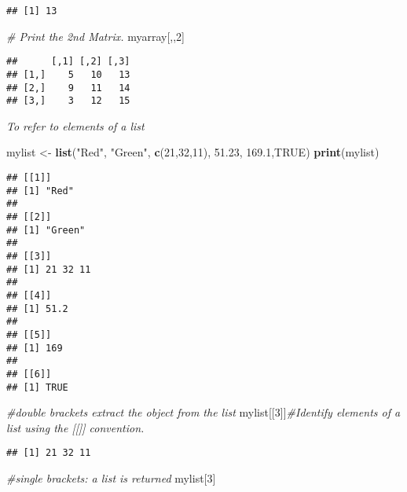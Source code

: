 \documentclass[]{book}
\newenvironment{Shaded}{\begin{snugshade}}{\end{snugshade}}
\newcommand{\KeywordTok}[1]{\textcolor[rgb]{0.13,0.29,0.53}{\textbf{#1}}}
\newcommand{\DecValTok}[1]{\textcolor[rgb]{0.00,0.00,0.81}{#1}}
\newcommand{\FloatTok}[1]{\textcolor[rgb]{0.00,0.00,0.81}{#1}}
\newcommand{\StringTok}[1]{\textcolor[rgb]{0.31,0.60,0.02}{#1}}
\newcommand{\CommentTok}[1]{\textcolor[rgb]{0.56,0.35,0.01}{\textit{#1}}}
\newcommand{\OtherTok}[1]{\textcolor[rgb]{0.56,0.35,0.01}{#1}}
\newcommand{\NormalTok}[1]{#1}
\theoremstyle{definition}
\theoremstyle{definition}
\theoremstyle{definition}
\theoremstyle{remark}
\begin{document}
\begin{verbatim}
## [1] 13
\end{verbatim}

\begin{Shaded}
\begin{Highlighting}[]
\CommentTok{# Print the 2nd Matrix.}
\NormalTok{myarray[,,}\DecValTok{2}\NormalTok{]}
\end{Highlighting}
\end{Shaded}

\begin{verbatim}
##      [,1] [,2] [,3]
## [1,]    5   10   13
## [2,]    9   11   14
## [3,]    3   12   15
\end{verbatim}

\emph{To refer to elements of a list}

\begin{Shaded}
\begin{Highlighting}[]
\NormalTok{mylist <-}\StringTok{ }\KeywordTok{list}\NormalTok{(}\StringTok{"Red"}\NormalTok{, }\StringTok{"Green"}\NormalTok{, }\KeywordTok{c}\NormalTok{(}\DecValTok{21}\NormalTok{,}\DecValTok{32}\NormalTok{,}\DecValTok{11}\NormalTok{),  }\FloatTok{51.23}\NormalTok{, }\FloatTok{169.1}\NormalTok{,}\OtherTok{TRUE}\NormalTok{)}
\KeywordTok{print}\NormalTok{(mylist)}
\end{Highlighting}
\end{Shaded}

\begin{verbatim}
## [[1]]
## [1] "Red"
## 
## [[2]]
## [1] "Green"
## 
## [[3]]
## [1] 21 32 11
## 
## [[4]]
## [1] 51.2
## 
## [[5]]
## [1] 169
## 
## [[6]]
## [1] TRUE
\end{verbatim}

\begin{Shaded}
\begin{Highlighting}[]
\CommentTok{#double brackets extract the object from the list}
\NormalTok{mylist[[}\DecValTok{3}\NormalTok{]]}\CommentTok{#Identify elements of a list using the [[]] convention.}
\end{Highlighting}
\end{Shaded}

\begin{verbatim}
## [1] 21 32 11
\end{verbatim}

\begin{Shaded}
\begin{Highlighting}[]
\CommentTok{#single brackets: a list is returned}
\NormalTok{mylist[}\DecValTok{3}\NormalTok{]}
\end{Highlighting}
\end{Shaded}
\end{document}
